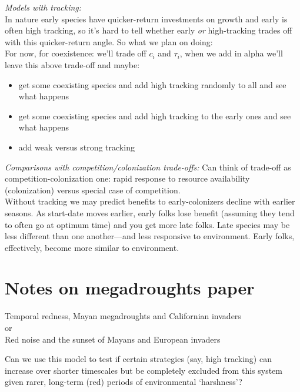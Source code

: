 \documentclass[11pt,a4paper,oneside]{article}
\begin{document}
\noindent \emph{Models with tracking:}\\
In nature early species have quicker-return investments on growth and early is often high tracking, so it's hard to tell whether early \emph{or} high-tracking trades off with this quicker-return angle. So what we plan on doing:\\
\noindent For now, for coexistence: we'll trade off \(c_{i}\) and \(\tau_{i}\), when we add in alpha we'll leave this above trade-off and maybe:
\begin{itemize}
\item get some coexisting species and add high tracking randomly to all and see what happens
\item get some coexisting species and add high tracking to the early ones and see what happens
\item add weak versus strong tracking
\end{itemize}

\noindent \emph{Comparisons with competition/colonization trade-offs:} Can think of trade-off as competition-colonization one: rapid response to resource availability (colonization) versus special case of competition.\\

Without tracking we may predict benefits to early-colonizers decline with earlier seasons. As start-date moves earlier, early folks lose benefit (assuming they tend to often go at optimum time) and you get more late folks. Late species may be less different than one another---and less responsive to environment. Early folks, effectively, become more similar to environment. 

\newpage
\section{Notes on megadroughts paper}
\begin{center}
{\Large Temporal redness, Mayan megadroughts and Californian invaders\\ or\\ Red noise and the sunset of Mayans and European invaders}
\end{center}

\noindent Can we use this model to test if certain strategies (say, high tracking) can increase over shorter timescales but be completely excluded from this system given rarer, long-term (red) periods of environmental `harshness'?\\
\end{document}

